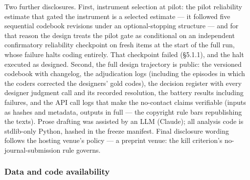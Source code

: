 Two further disclosures. First, instrument selection at pilot: the pilot reliability estimate that gated the instrument is a selected estimate --- it followed five sequential codebook revisions under an optional-stopping structure --- and for that reason the design treats the pilot gate as conditional on an independent confirmatory reliability checkpoint on fresh items at the start of the full run, whose failure halts coding entirely. That checkpoint failed (\S{}5.1.1), and the halt executed as designed. Second, the full design trajectory is public: the versioned codebook with changelog, the adjudication logs (including the episodes in which the coders corrected the designers' gold codes), the decision register with every designer judgment call and its recorded resolution, the battery results including failures, and the API call logs that make the no-contact claims verifiable (inputs as hashes and metadata, outputs in full --- the copyright rule bars republishing the texts). Prose drafting was assisted by an LLM (Claude); all analysis code is stdlib-only Python, hashed in the freeze manifest. Final disclosure wording follows the hosting venue's policy --- a preprint venue: the kill criterion's no-journal-submission rule governs.

\subsubsection{Data and code availability}\label{data-and-code-availability}


